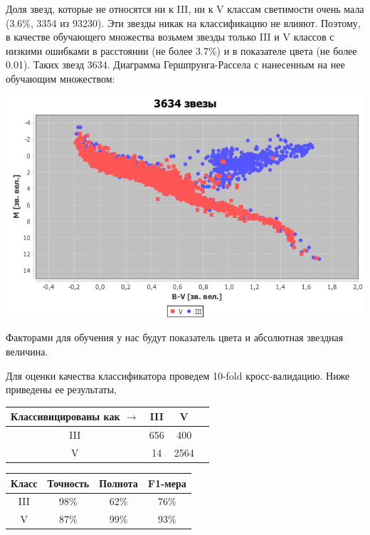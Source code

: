 \documentclass[14pt]{article}
\begin{document}
        Доля звезд, которые не относятся ни к III, ни к V классам светимости очень мала (3.6\%, 3354 из 93230). Эти звезды никак на классификацию не влияют. Поэтому, в качестве обучающего множества возьмем звезды только III и V классов с низкими ошибками в расстоянии (не более 3.7\%) и в показателе цвета (не более 0.01). Таких звезд $3634$. Диаграмма Гершпрунга-Рассела с нанесенным на нее обучающим множеством:
        \begin{center}
            \includegraphics[scale=0.4]{ml-learn.png}   
        \end{center}
        Факторами для обучения у нас будут показатель цвета и абсолютная звездная величина.
        
        Для оценки качества классификатора проведем 10-fold кросс-валидацию. Ниже приведены ее результаты, \\

        \begin{center}
            \begin{tabular} {| c | c | c | c |}
                \hline
                Классивицированы как $\rightarrow$   &    III   &    V    \\
                \hline
                III    &    656    &    400    \\		
                \hline
                V    &    14    &	2564    \\
                \hline
            \end{tabular}
            \begin{tabular} {| c | c | c | c |}
                \hline
                Класс    &    Точность   &    Полнота    &    F1-мера     \\
                \hline
                III    &    98\%    &    62\%    &    76\% \\		
                V	&	87\%		&	99\%		&	93\%		\\
                \hline
            \end{tabular}
        \end{center}
        
\end{document}
